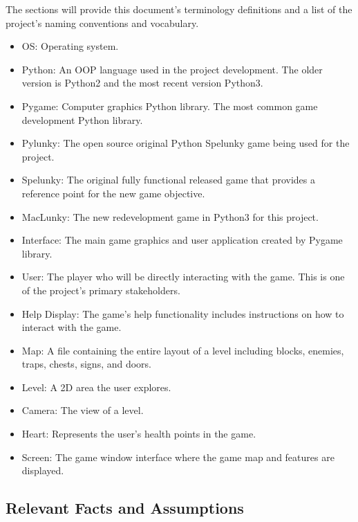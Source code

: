 \documentclass[12pt, titlepage]{article}
\begin{document}
The sections will provide this document's terminology definitions and a list of the project's naming conventions and vocabulary. 
\begin{itemize}
    \item OS: Operating system. 
    \item Python: An OOP language used in the project development. The older version is Python2 and the most recent version Python3.
    \item Pygame: Computer graphics Python library. The most common game development Python library.
    \item Pylunky: The open source original Python Spelunky game being used for the project. 
    \item Spelunky: The original fully functional released game that provides a reference point for the new game objective. 
    \item MacLunky: The new redevelopment game in Python3 for this project. 
    \item Interface: The main game graphics and user application created by Pygame library. 
    \item User: The player who will be directly interacting with the game. This is one of the project's primary stakeholders. 
    \item Help Display: The game's help functionality includes instructions on how to interact with the game.
    \item Map: A file containing the entire layout of a level including blocks, enemies, traps, chests, signs, and doors.
    \item Level: A 2D area the user explores.
    \item Camera: The view of a level.
    \item Heart: Represents the user's health points in the game. 
    \item Screen: The game window interface where the game map and features are displayed. 
\end{itemize}

\subsection{Relevant Facts and Assumptions}
\end{document}
